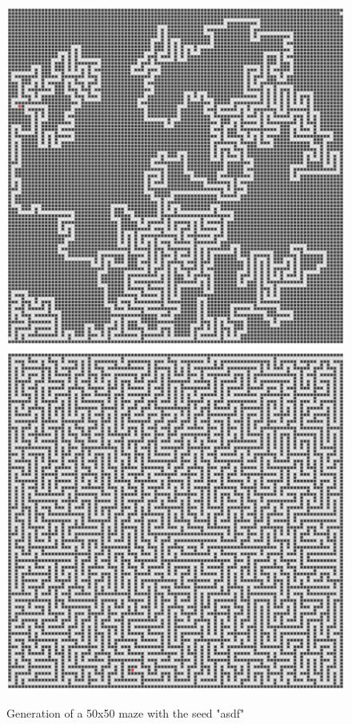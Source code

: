 \documentclass{article}
\begin{document}
\begin{figure}[h]
    \centering
    \includegraphics*[scale=0.37]{"mazegen.png"}
    \includegraphics*[scale=0.37]{"mazegen2.png"}
    \caption{Generation of a 50x50 maze with the seed "asdf"}
    \label{fig:search}
\end{figure}
\newpage
\end{document}
